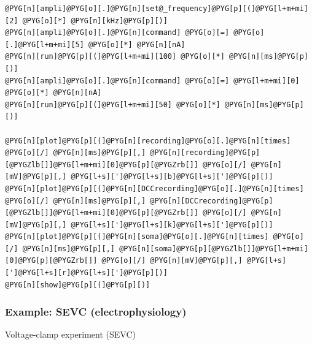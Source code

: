 \documentclass[letterpaper,10pt,english]{manual}
\begin{document}
\begin{Verbatim}[commandchars=@\[\]]
@PYG[n][ampli]@PYG[o][.]@PYG[n][set@_frequency]@PYG[p][(]@PYG[l+m+mi][2] @PYG[o][*] @PYG[n][kHz]@PYG[p][)]
@PYG[n][ampli]@PYG[o][.]@PYG[n][command] @PYG[o][=] @PYG[o][.]@PYG[l+m+mi][5] @PYG[o][*] @PYG[n][nA]
@PYG[n][run]@PYG[p][(]@PYG[l+m+mi][100] @PYG[o][*] @PYG[n][ms]@PYG[p][)]
@PYG[n][ampli]@PYG[o][.]@PYG[n][command] @PYG[o][=] @PYG[l+m+mi][0] @PYG[o][*] @PYG[n][nA]
@PYG[n][run]@PYG[p][(]@PYG[l+m+mi][50] @PYG[o][*] @PYG[n][ms]@PYG[p][)]

@PYG[n][plot]@PYG[p][(]@PYG[n][recording]@PYG[o][.]@PYG[n][times] @PYG[o][/] @PYG[n][ms]@PYG[p][,] @PYG[n][recording]@PYG[p][@PYGZlb[]]@PYG[l+m+mi][0]@PYG[p][@PYGZrb[]] @PYG[o][/] @PYG[n][mV]@PYG[p][,] @PYG[l+s][']@PYG[l+s][b]@PYG[l+s][']@PYG[p][)]
@PYG[n][plot]@PYG[p][(]@PYG[n][DCCrecording]@PYG[o][.]@PYG[n][times] @PYG[o][/] @PYG[n][ms]@PYG[p][,] @PYG[n][DCCrecording]@PYG[p][@PYGZlb[]]@PYG[l+m+mi][0]@PYG[p][@PYGZrb[]] @PYG[o][/] @PYG[n][mV]@PYG[p][,] @PYG[l+s][']@PYG[l+s][k]@PYG[l+s][']@PYG[p][)]
@PYG[n][plot]@PYG[p][(]@PYG[n][soma]@PYG[o][.]@PYG[n][times] @PYG[o][/] @PYG[n][ms]@PYG[p][,] @PYG[n][soma]@PYG[p][@PYGZlb[]]@PYG[l+m+mi][0]@PYG[p][@PYGZrb[]] @PYG[o][/] @PYG[n][mV]@PYG[p][,] @PYG[l+s][']@PYG[l+s][r]@PYG[l+s][']@PYG[p][)]
@PYG[n][show]@PYG[p][(]@PYG[p][)]
\end{Verbatim}

\resetcurrentobjects
\hypertarget{--doc-examples-electrophysiology_SEVC}{}

\hypertarget{index-24}{}\subsubsection{Example: SEVC (electrophysiology)}

Voltage-clamp experiment (SEVC)
\end{document}
